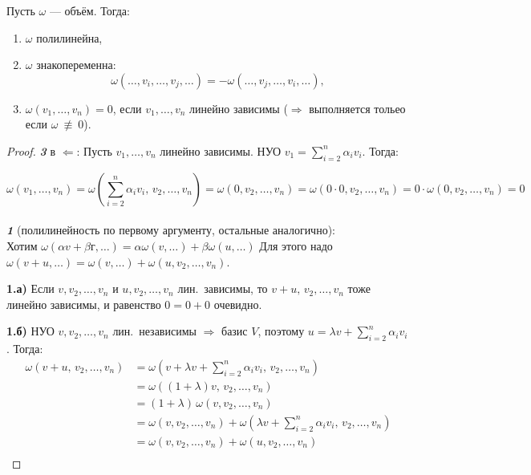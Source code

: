 \begin{stmt}
    Пусть $\omega$ --- объём. Тогда:
    \begin{enumerate}[label=\textbf{\arabic*.}]
        \item $\omega$ полилинейна,
        \item $\omega$ знакопеременна:
        \[
            \omega(\dots, v_i, \dots, v_j, \dots) = -\omega(\dots, v_j, \dots, v_i, \dots),
        \]
        \item $\omega(v_1, \dots, v_n) = 0$, если $v_1, \dots, v_n$ линейно зависимы (\textcircled{$\Rightarrow$} выполняется тольео если $\omega \ \not\equiv \ 0$).
    \end{enumerate}

    \begin{proof}
        \textbf{\emph{3}} в \textcircled{$\Leftarrow$}: Пусть $v_1, \dots, v_n$ линейно зависимы. НУО $v_1 = \sum_{i=2}^{n} \alpha_i v_i$. Тогда:
    
        \[  
            \omega(v_1, \dots, v_n)
            = \omega\!\left(\sum_{i=2}^{n} \alpha_i v_i,\, v_2, \dots, v_n\right)
            = \omega(0, v_2, \dots, v_n)
            = \omega(0 \cdot 0, v_2, \dots, v_n)
            = 0 \cdot \omega(0, v_2, \dots, v_n) = 0        
        \]
        \\

        \textbf{\emph{1}} (полилинейность по первому аргументу, остальные аналогично): \\
        Хотим $\omega(\alpha v + \beta г, \dots) = \alpha \omega(v, \dots) + \beta \omega(u, \dots)$
        Для этого надо $\omega(v + u, \dots) = \omega(v, \dots) + \omega(u, v_2, \dots, v_n)$.

        \textbf{1.а)} Если $v, v_2, \dots, v_n$ и $u, v_2, \dots, v_n$ лин.\ зависимы,
        то $v + u,\, v_2, \dots, v_n$ тоже линейно зависимы, и равенство $0 = 0 + 0$ очевидно.

        \textbf{1.б)} НУО $v, v_2, \dots, v_n$ лин.\ независимы $\Rightarrow$ базис $V$,
        поэтому $u = \lambda v + \sum_{i=2}^{n} \alpha_i v_i$. Тогда:
        \begin{align*}
            \omega\!\left(v + u,\, v_2, \dots, v_n\right)
            &= \omega\!\left(v + \lambda v + \sum_{i=2}^{n}\alpha_i v_i,\, v_2, \dots, v_n\right) \\
            &= \omega\!\left((1+\lambda)v,\, v_2, \dots, v_n\right) \\
            &= (1+\lambda)\,\omega(v, v_2, \dots, v_n) \\
            &= \omega(v, v_2, \dots, v_n) + \omega\!\left(\lambda v + \sum_{i=2}^{n}\alpha_i v_i,\, v_2, \dots, v_n\right) \\
            &= \omega(v, v_2, \dots, v_n) + \omega(u, v_2, \dots, v_n) \\
        \end{align*}


\end{proof}
\end{stmt}

